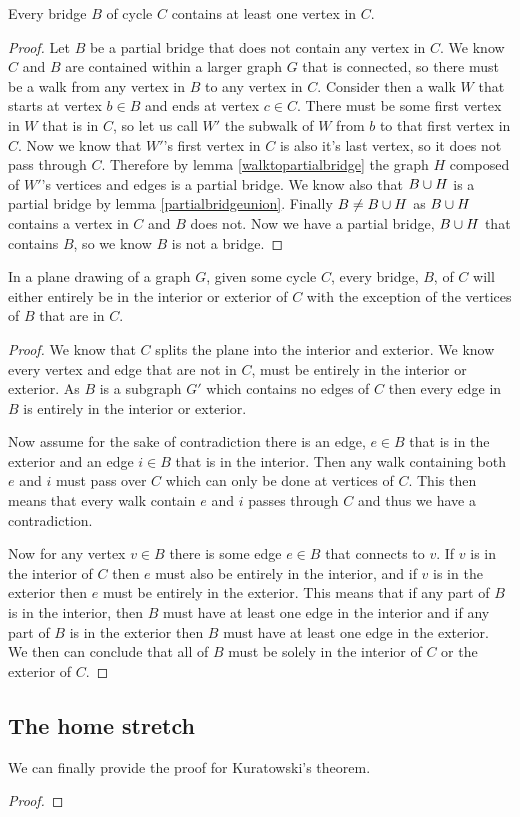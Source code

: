 \documentclass{article}
\begin{document}
\begin{lemma}
	Every bridge $B$ of cycle $C$ contains at least one vertex in $C$.
\end{lemma}
\begin{proof}
	Let $B$ be a partial bridge that does not contain any vertex in $C$. We know $C$ and $B$ are contained within a larger graph $G$ that is connected, so there must be a walk from any vertex in $B$ to any vertex in $C$. Consider then a walk $W$ that starts at vertex $b\in B$ and ends at vertex $c\in C$. There must be some first vertex in $W$ that is in $C$, so let us call $W'$ the subwalk of $W$ from $b$ to that first vertex in $C$. Now we know that $W'$'s first vertex in $C$ is also it's last vertex, so it does not pass through $C$. Therefore by lemma \ref{walktopartialbridge} the graph $H$ composed of $W'$'s vertices and edges is a partial bridge. We know also that $B\cup H$ is a partial bridge by lemma \ref{partialbridgeunion}. Finally $B\not=B\cup H$ as $B\cup H$ contains a vertex in $C$ and $B$ does not. Now we have a partial bridge, $B\cup H$ that contains $B$, so we know $B$ is not a bridge.
\end{proof}

\begin{lemma}
	In a plane drawing of a graph $G$, given some cycle $C$, every bridge, $B$, of $C$ will either entirely be in the interior or exterior of $C$ with the exception of the vertices of $B$ that are in $C$.
\end{lemma}
\begin{proof}
	We know that $C$ splits the plane into the interior and exterior. We know every vertex and edge that are not in $C$, must be entirely in the interior or exterior. As $B$ is a subgraph $G'$ which contains no edges of $C$ then every edge in $B$ is entirely in the interior or exterior.
	
	Now assume for the sake of contradiction there is an edge, $e\in B$ that is in the exterior and an edge $i\in B$ that is in the interior. Then any walk containing both $e$ and $i$ must pass over $C$ which can only be done at vertices of $C$. This then means that every walk contain $e$ and $i$ passes through $C$ and thus we have a contradiction.
	
	Now for any vertex $v\in B$ there is some edge $e\in B$ that connects to $v$. If $v$ is in the interior of $C$ then $e$ must also be entirely in the interior, and if $v$ is in the exterior then $e$ must be entirely in the exterior. This means that if any part of $B$ is in the interior, then $B$ must have at least one edge in the interior and if any part of $B$ is in the exterior then $B$ must have at least one edge in the exterior. We then can conclude that all of $B$ must be solely in the interior of $C$ or the exterior of $C$.
\end{proof}



\subsection{The home stretch}
We can finally provide the proof for Kuratowski's theorem.

\THEBIGONE*

\begin{proof}
\end{proof}
\end{document}
